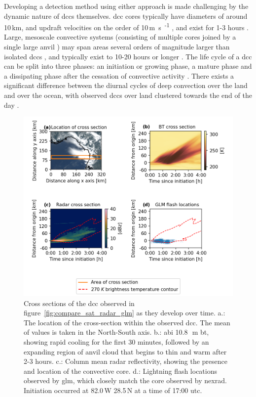 Developing a detection method using either approach is made challenging by the dynamic nature of \acrshort{dcc}s themselves.
\acrshort{dcc} cores typically have diameters of around 10\,\unit{km}, and updraft velocities on the order of 10\,\unit{m s\textsuperscript{-1}} \citep{weisman_mesoscale_2015}, and exist for 1-3 hours \citep{chen_diurnal_1997}.
Large, mesoscale convective systems (consisting of multiple cores joined by a single large anvil \citep{roca_simple_2017}) may span areas several orders of magnitude larger than isolated \acrshort{dcc}s \citep{houze_mesoscale_2004}, and typically exist to 10-20 hours or longer \citep{chen_diurnal_1997}.
The life cycle of a \acrshort{dcc} can be split into three phases: an initiation or growing phase, a mature phase and a dissipating phase after the cessation of convective activity \citep{wall_life_2018}.
There exists a significant difference between the diurnal cycles of deep convection over the land and over the ocean, with observed \acrshort{dcc}s over land clustered towards the end of the day \citep{taylor_evaluating_2017}.

\begin{figure}[t]
    \includegraphics[width=\textwidth]{figures/chapter1_02.png}
    \caption[
    Cross sections of the \acrshort{dcc} observed in figure~\ref{fig:compare_sat_radar_glm} as they develop over time
    ]{
    Cross sections of the \acrshort{dcc} observed in figure~\ref{fig:compare_sat_radar_glm} as they develop over time. a.: The location of the cross-section within the observed \acrshort{dcc}. The mean of values is taken in the North-South axis. b.: \acrshort{abi} 10.8\,\unit{\mu m} \acrshort{bt}, showing rapid cooling for the first 30 minutes, followed by an expanding region of anvil cloud that begins to thin and warm after 2-3 hours. c.: Column mean radar reflectivity, showing the presence and location of the convective core. d.: Lightning flash locations observed by \acrshort{glm}, which closely match the core observed by \acrshort{nexrad}. Initiation occurred at 82.0\,\textdegree W 28.5\,\textdegree N at a time of 17:00 \acrshort{utc}.
    }
    \label{fig:dcc_over_time}
\end{figure}

